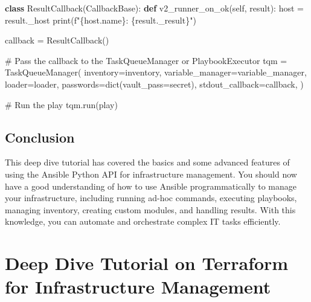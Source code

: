 \documentclass[
  letterpaper,
  DIV=11,
  numbers=noendperiod]{scrreprt}
\newenvironment{Shaded}{\begin{snugshade}}{\end{snugshade}}
\newcommand{\BuiltInTok}[1]{\textcolor[rgb]{0.00,0.23,0.31}{#1}}
\newcommand{\CommentTok}[1]{\textcolor[rgb]{0.37,0.37,0.37}{#1}}
\newcommand{\KeywordTok}[1]{\textcolor[rgb]{0.00,0.23,0.31}{\textbf{#1}}}
\newcommand{\NormalTok}[1]{\textcolor[rgb]{0.00,0.23,0.31}{#1}}
\newcommand{\OperatorTok}[1]{\textcolor[rgb]{0.37,0.37,0.37}{#1}}
\newcommand{\SpecialCharTok}[1]{\textcolor[rgb]{0.37,0.37,0.37}{#1}}
\newcommand{\SpecialStringTok}[1]{\textcolor[rgb]{0.13,0.47,0.30}{#1}}
\newcommand{\StringTok}[1]{\textcolor[rgb]{0.13,0.47,0.30}{#1}}
\newcommand{\VariableTok}[1]{\textcolor[rgb]{0.07,0.07,0.07}{#1}}
\begin{document}
\begin{Shaded}
\begin{Highlighting}[]
\KeywordTok{class}\NormalTok{ ResultCallback(CallbackBase):}
    \KeywordTok{def}\NormalTok{ v2\_runner\_on\_ok(}\VariableTok{self}\NormalTok{, result):}
\NormalTok{        host }\OperatorTok{=}\NormalTok{ result.\_host}
        \BuiltInTok{print}\NormalTok{(}\SpecialStringTok{f"}\SpecialCharTok{\{}\NormalTok{host}\SpecialCharTok{.}\NormalTok{name}\SpecialCharTok{\}}\SpecialStringTok{: }\SpecialCharTok{\{}\NormalTok{result}\SpecialCharTok{.}\NormalTok{\_result}\SpecialCharTok{\}}\SpecialStringTok{"}\NormalTok{)}

\NormalTok{callback }\OperatorTok{=}\NormalTok{ ResultCallback()}

\CommentTok{\# Pass the callback to the TaskQueueManager or PlaybookExecutor}
\NormalTok{tqm }\OperatorTok{=}\NormalTok{ TaskQueueManager(}
\NormalTok{    inventory}\OperatorTok{=}\NormalTok{inventory,}
\NormalTok{    variable\_manager}\OperatorTok{=}\NormalTok{variable\_manager,}
\NormalTok{    loader}\OperatorTok{=}\NormalTok{loader,}
\NormalTok{    passwords}\OperatorTok{=}\BuiltInTok{dict}\NormalTok{(vault\_pass}\OperatorTok{=}\StringTok{\textquotesingle{}secret\textquotesingle{}}\NormalTok{),}
\NormalTok{    stdout\_callback}\OperatorTok{=}\NormalTok{callback,}
\NormalTok{)}

\CommentTok{\# Run the play}
\NormalTok{tqm.run(play)}
\end{Highlighting}
\end{Shaded}

\section{Conclusion}\label{conclusion-51}

This deep dive tutorial has covered the basics and some advanced
features of using the Ansible Python API for infrastructure management.
You should now have a good understanding of how to use Ansible
programmatically to manage your infrastructure, including running ad-hoc
commands, executing playbooks, managing inventory, creating custom
modules, and handling results. With this knowledge, you can automate and
orchestrate complex IT tasks efficiently.


\chapter{Deep Dive Tutorial on Terraform for Infrastructure
Management}\label{deep-dive-tutorial-on-terraform-for-infrastructure-management}
\end{document}
